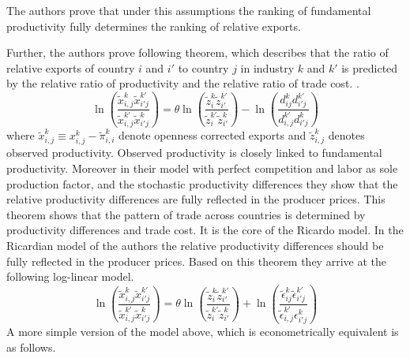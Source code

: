  The authors prove that under this assumptions the ranking of fundamental productivity fully determines the ranking of relative exports.
\par
 Further, the authors prove following theorem, which describes that the ratio of relative exports of country $i$ and $i'$ to country $j$ in industry $k$ and $k'$ is predicted by the relative ratio of productivity and the relative ratio of trade cost. \parencite{costinot}.
\[ \ln \left( \frac{\tilde{x}_{i,j}^k \tilde{x}^{k'}_{i'j}}{\tilde{x}_{i,j}^{k'} \tilde{x}^{k}_{i'j}} \right)= \theta \ln \left( \frac{\tilde{z}_{i}^k \tilde{z}^{k'}_{i'}}{\tilde{z}_{i}^{k'} \tilde{z}^{k}_{i'}} \right)-\ln \left( \frac{ d_{ij}^k d^{k'}_{i'j}}{d_{i,j}^{k'} {d}^{k}_{i'j}} \right) \]
where $\tilde{x}_{i,j}^k \equiv x_{i,j}^k -  \tilde{\pi}^k_{i,i} $ denote openness corrected exports and $\tilde{z}_{i,j}^k$ denotes observed productivity.
Observed productivity is closely linked to fundamental productivity. %
Moreover in their model  with perfect competition and labor as sole production factor, and the stochastic productivity differences they show that the relative productivity differences are fully reflected in the producer prices.
This theorem shows that the pattern of trade across countries is determined by productivity differences and trade cost. It is the core of the Ricardo model.
 In the Ricardian model of the authors the relative productivity differences should be fully reflected in the producer prices.
Based on this theorem they arrive at the following log-linear model.
\[ \ln \left( \frac{\tilde{x}_{i,j}^k \tilde{x}^{k'}_{i'j}}{\tilde{x}_{i,j}^{k'} \tilde{x}^{k}_{i'j}} \right)= \theta \ln \left( \frac{\tilde{z}_{i}^k \tilde{z}^{k'}_{i'}}{\tilde{z}_{i}^{k'} \tilde{z}^{k}_{i'}} \right)+\ln \left( \frac{ \tilde{\epsilon}_{ij}^k \tilde{\epsilon}^{k'}_{i'j}}{\tilde{\epsilon}_{i,j}^{k'} {\epsilon}^{k}_{i'j}} \right) \]
A more simple version of the model above, which is econometrically equivalent is as follows.

